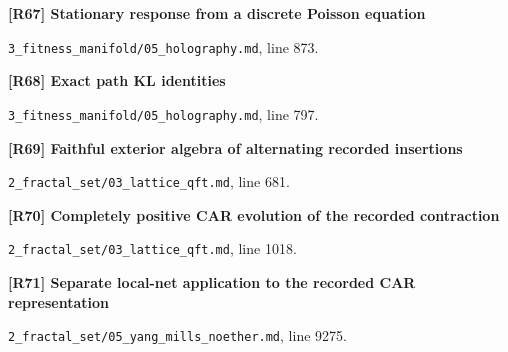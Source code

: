 \documentclass[11pt,a4paper]{article}
\begin{document}
\par\medskip\noindent\begin{minipage}{\linewidth}\textbf{[R67] Stationary response from a discrete Poisson equation}\label{src:thm-algorithmic-stationary-response}\par
{\small\texttt{}\par
\nolinkurl{3_fitness_manifold/05_holography.md}, line 873.\par}
\end{minipage}\par

\par\medskip\noindent\begin{minipage}{\linewidth}\textbf{[R68] Exact path KL identities}\label{src:prop-algorithmic-path-kl-identities}\par
{\small\texttt{}\par
\nolinkurl{3_fitness_manifold/05_holography.md}, line 797.\par}
\end{minipage}\par

\par\medskip\noindent\begin{minipage}{\linewidth}\textbf{[R69] Faithful exterior algebra of alternating recorded insertions}\label{src:thm-lqft-oriented-word-algebra}\par
{\small\texttt{}\par
\nolinkurl{2_fractal_set/03_lattice_qft.md}, line 681.\par}
\end{minipage}\par

\par\medskip\noindent\begin{minipage}{\linewidth}\textbf{[R70] Completely positive CAR evolution of the recorded contraction}\label{src:thm-lqft-record-car-channel}\par
{\small\texttt{}\par
\nolinkurl{2_fractal_set/03_lattice_qft.md}, line 1018.\par}
\end{minipage}\par

\par\medskip\noindent\begin{minipage}{\linewidth}\textbf{[R71] Separate local-net application to the recorded CAR representation}\label{src:thm-ym-hk-record-instantiation}\par
{\small\texttt{}\par
\nolinkurl{2_fractal_set/05_yang_mills_noether.md}, line 9275.\par}
\end{minipage}\par
\end{document}
